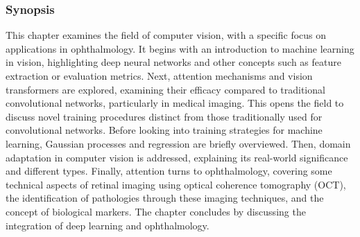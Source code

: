 \subsubsection{Synopsis} This chapter examines the field of computer vision, with a specific focus on applications in ophthalmology. It begins with an introduction to machine learning in vision, highlighting deep neural networks and other concepts such as feature extraction or evaluation metrics. Next, attention mechanisms and vision transformers are explored, examining their efficacy compared to traditional convolutional networks, particularly in medical imaging. This opens the field to discuss novel training procedures distinct from those traditionally used for convolutional networks. Before looking into training strategies for machine learning, Gaussian processes and regression are briefly overviewed. Then, domain adaptation in computer vision is addressed, explaining its real-world significance and different types. Finally, attention turns to ophthalmology, covering some technical aspects of retinal imaging using optical coherence tomography (OCT), the identification of pathologies through these imaging techniques, and the concept of biological markers. The chapter concludes by discussing the integration of deep learning and ophthalmology.









